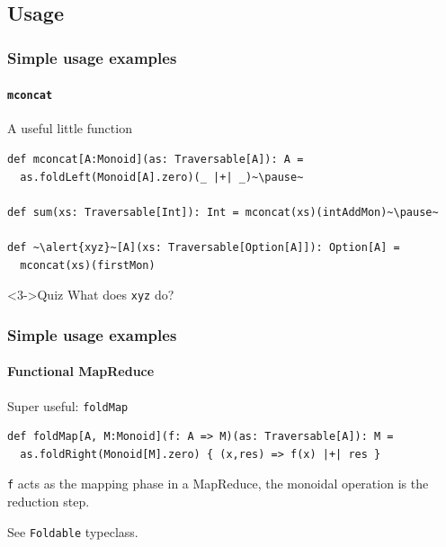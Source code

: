 \documentclass{beamer}
\begin{document}
\subsection{Usage}
\begin{frame}[fragile]
  \frametitle{Simple usage examples}
  \framesubtitle{\texttt{mconcat}}

  \begin{block}{A useful little function}
  \begin{lstlisting}
def mconcat[A:Monoid](as: Traversable[A]): A =
  as.foldLeft(Monoid[A].zero)(_ |+| _)~\pause~

def sum(xs: Traversable[Int]): Int = mconcat(xs)(intAddMon)~\pause~

def ~\alert{xyz}~[A](xs: Traversable[Option[A]]): Option[A] =
  mconcat(xs)(firstMon)
  \end{lstlisting}
  \end{block}
  \begin{block}<3->{Quiz}
    What does \texttt{xyz} do?
  \end{block}
\end{frame}

\begin{frame}[fragile]
  \frametitle{Simple usage examples}
  \framesubtitle{Functional MapReduce}
  \begin{block}{Super useful: \texttt{foldMap}}
  \begin{lstlisting}
def foldMap[A, M:Monoid](f: A => M)(as: Traversable[A]): M =
  as.foldRight(Monoid[M].zero) { (x,res) => f(x) |+| res }
  \end{lstlisting}
  \end{block}

  \texttt{f} acts as the mapping phase in a MapReduce, the monoidal
  operation is the reduction step.

  \vspace{6ex}

  See \texttt{Foldable} typeclass.
\end{frame}
\end{document}
